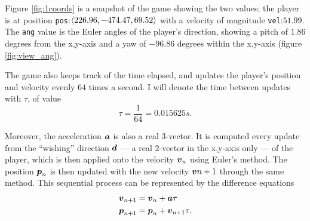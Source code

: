 Figure \ref{fig:1coords} is a snapshot of the game showing the two values; the player is at position \verb|pos|:$\left\langle 226.96, -474.47, 69.52 \right\rangle$ with a velocity of magnitude \verb|vel|:$51.99$. The \verb|ang| value is the Euler angles of the player's direction, showing a pitch of $1.86$ degrees from the x,y-axis and a yaw of $-96.86$ degrees within the x,y-axis (figure \ref{fig:view_ang}).


The game also keeps track of the time elapsed, and updates the player's position and velocity evenly $64$ times a second. I will denote the time between updates with $\tau$, of value
\[
    \tau = \frac{1}{64} = 0.015625 \si{s}.
\]



Moreover, the acceleration $\boldsymbol{a}$ is also a real 3-vector. It is computed every update from the ``wishing'' direction $\boldsymbol{d}$ --- a real 2-vector in the x,y-axis only --- of the player, which is then applied onto the velocity $\boldsymbol{v}_n$ using Euler's method. The position $\boldsymbol{p}_n$ is then updated with the new velocity $\boldsymbol{v}{n+1}$ through the same method. This sequential process can be represented by the difference equations
\begin{align}
    \boldsymbol{v}_{n+1} &= \boldsymbol{v}_n + \boldsymbol{a} \tau\\
    \boldsymbol{p}_{n+1} &= \boldsymbol{p}_n + \boldsymbol{v}_{n+1} \tau.
\end{align}

